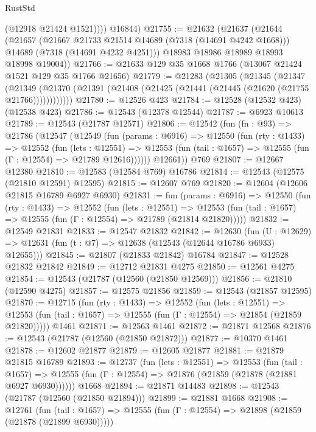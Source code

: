 \begin{lexlean}{RustStd}
\begin{coremodule}
            (@12918 @21424 @1521))))
      @16844)
@21755 := @21632
    (@21637
      (@21644
        (@21657
          (@21667 @21733 @21514 @14689 (@7318 (@14691 @4242 @1668)))
          @14689
          (@7318 (@14691 @4232 @4251)))
        @18983
        @18986
        @18989
        @18993
        @18998
        @19004))
@21766 := @21633 @129 @35 @1668 @1766 (@13067 @21424 @1521 @129 @35 @1766 @21656)
@21779 := @21283
    (@21305
      (@21345
        (@21347
          (@21349 (@21370 (@21391 (@21408 (@21425 (@21441 (@21445 (@21620 (@21755 @21766))))))))))))
@21780 := @12526 @423
@21784 := @12528 (@12532 @423) (@12538 @423)
@21786 := @12543 (@12378 @12544)
@21787 := @6923 @10613
@21789 := @12543 (@21787 @12571)
@21806 := @12542
    (fun (fn : @93) =>
    @21786
      (@12547
        (@12549
          (fun (params : @6916) =>
          @12550
            (fun (rty : @1433) =>
            @12552
              (fun (lets : @12551) =>
              @12553 (fun (tail : @1657) => @12555 (fun (Γ : @12554) => @21789 @12616))))))
        @12661))
    @769
@21807 := @12667 @12380
@21810 := @12583 (@12584 @769) @16786
@21814 := @12543 (@12575 (@21810 @12591) @12595)
@21815 := @12607 @769
@21820 := @12604 (@12606 @21815 @16789 @6927 @6930)
@21831 := fun (params : @6916) =>
  @12550
    (fun (rty : @1433) =>
    @12552
      (fun (lets : @12551) =>
      @12553 (fun (tail : @1657) => @12555 (fun (Γ : @12554) => @21789 (@21814 @21820)))))
@21832 := @12549 @21831
@21833 := @12547 @21832
@21842 := @12630
    (fun (U : @12629) => @12631 (fun (t : @7) => @12638 (@12543 (@12644 @16786 @6933) @12655)))
@21845 := @21807 (@21833 @21842) @16784
@21847 := @12528 @21832 @21842
@21849 := @12712 @21831 @4275
@21850 := @12561 @4275
@21854 := @12543 (@21787 (@12560 (@21850 @12569)))
@21856 := @21810 (@12590 @4275)
@21857 := @12575 @21856
@21859 := @12543 (@21857 @12595)
@21870 := @12715
    (fun (rty : @1433) =>
    @12552
      (fun (lets : @12551) =>
      @12553 (fun (tail : @1657) => @12555 (fun (Γ : @12554) => @21854 (@21859 @21820)))))
    @1461
@21871 := @12563 @1461
@21872 := @21871 @12568
@21876 := @12543 (@21787 (@12560 (@21850 @21872)))
@21877 := @10370 @1461
@21878 := @12602 @21877
@21879 := @12605 @21877
@21881 := @21879 @21815 @16789
@21893 := @12737
    (fun (lets : @12551) =>
    @12553
      (fun (tail : @1657) =>
      @12555 (fun (Γ : @12554) => @21876 (@21859 (@21878 (@21881 @6927 @6930))))))
    @1668
@21894 := @21871 @14483
@21898 := @12543 (@21787 (@12560 (@21850 @21894)))
@21899 := @21881 @1668
@21908 := @12761
    (fun (tail : @1657) => @12555 (fun (Γ : @12554) => @21898 (@21859 (@21878 (@21899 @6930)))))

\end{coremodule}
\end{lexlean}

